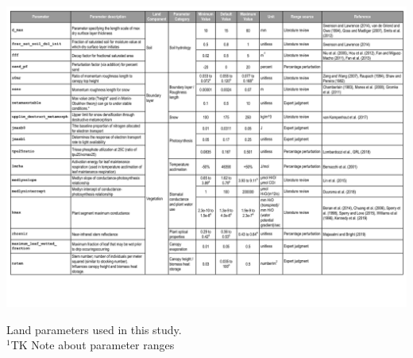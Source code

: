 \documentclass[draft,grl]{agutexSI2019}
\begin{document}
\begin{table}
\noindent\includegraphics[width=\textwidth]{writing/figs/Table_Parameter_List.pdf}
  \caption{Land parameters used in this study.\\
    \footnotesize{$^1$TK Note about parameter ranges
    }}
 \label{table:param_list}
 \end{table}
\end{document}
